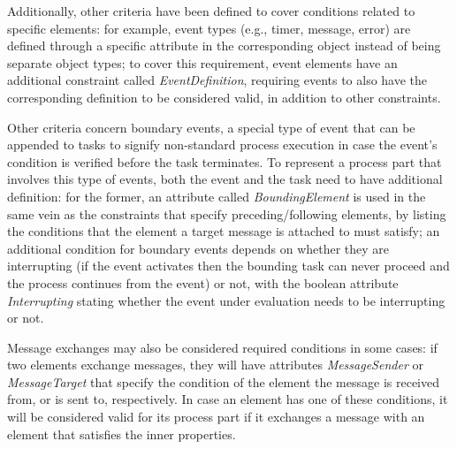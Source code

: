Additionally, other criteria have been defined to cover conditions related to specific elements: for example, event types (e.g., timer, message, error) are defined through a specific attribute in the corresponding object instead of being separate object types; to cover this requirement, event elements have an additional constraint called \textit{EventDefinition}, requiring events to also have the corresponding definition to be considered valid, in addition to other constraints.

Other criteria concern boundary events, a special type of event that can be appended to tasks to signify non-standard process execution in case the event's condition is verified before the task terminates. To represent a process part that involves this type of events, both the event and the task need to have additional definition: for the former, an attribute called \textit{BoundingElement} is used in the same vein as the constraints that specify preceding/following elements, by listing the conditions that the element a target message is attached to must satisfy; an additional condition for boundary events depends on whether they are interrupting (if the event activates then the bounding task can never proceed and the process continues from the event) or not, with the boolean attribute \textit{Interrupting} stating whether the event under evaluation needs to be interrupting or not.

Message exchanges may also be considered required conditions in some cases: if two elements exchange messages, they will have attributes \textit{MessageSender} or \textit{MessageTarget} that specify the condition of the element the message is received from, or is sent to, respectively. In case an element has one of these conditions, it will be considered valid for its process part if it exchanges a message with an element that satisfies the inner properties.


